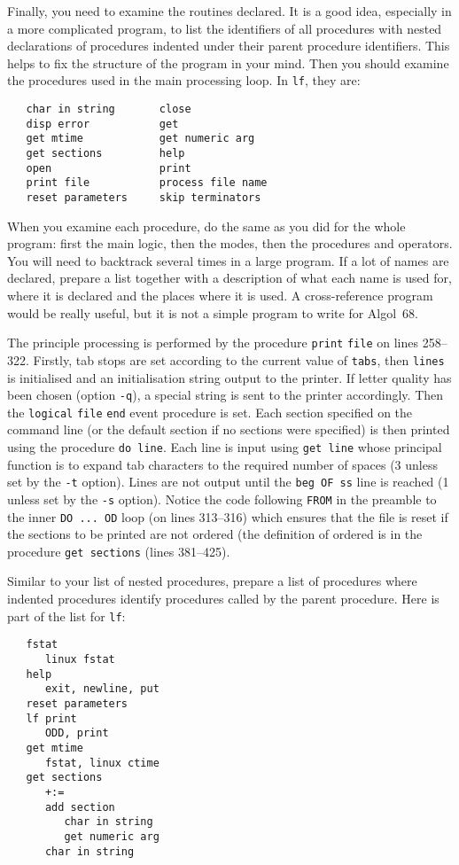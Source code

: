 Finally, you need to examine the routines declared. It is a good
idea, especially in a more complicated program, to list the
identifiers of all procedures with nested declarations of procedures
indented under their parent procedure identifiers. This helps to fix
the structure of the program in your mind. Then you should examine
the procedures used in the main processing loop.  In \verb|lf|, they
are:
\begin{verbatim}
   char in string       close
   disp error           get
   get mtime            get numeric arg
   get sections         help
   open                 print
   print file           process file name
   reset parameters     skip terminators
\end{verbatim}
\noindent
When you examine each procedure, do the same as you did for the whole
program: first the main logic, then the modes, then the procedures
and operators. You will need to backtrack several times in a large
program. If a lot of names are declared, prepare a list together with
a description of what each name is used for, where it is declared and
the places where it is used. A cross-reference program would be
really useful, but it is not a simple program to write for Algol~68.

The principle processing is performed by the procedure \verb|print|
\verb|file| on lines 258--322. Firstly, tab stops are set according
to the current value of \verb|tabs|, then \verb|lines| is initialised
and an initialisation string output to the printer. If letter quality
has been chosen (option \verb|-q|), a special string is sent to the
printer accordingly. Then the \verb|logical| \verb|file| \verb|end|
event procedure is set. Each section specified on the command line
(or the default section if no sections were specified) is then
printed using the procedure \verb|do line|. Each line is input using
\verb|get line| whose principal function is to expand tab characters
to the required number of spaces (3 unless set by the \verb|-t|
option). Lines are not output until the \verb|beg OF ss| line is
reached (1 unless set by the \verb|-s| option). Notice the code
following \verb|FROM| in the preamble to the inner \verb|DO ... OD|
loop (on lines 313--316) which ensures that the file is reset if the
sections to be printed are not ordered (the definition of ordered is
in the procedure \verb|get sections| (lines 381--425).

Similar to your list of nested procedures, prepare a list of
procedures where indented procedures identify procedures called by
the parent procedure. Here is part of the list for \verb|lf|:
\goodbreak
\begin{verbatim}
   fstat
      linux fstat
   help
      exit, newline, put
   reset parameters
   lf print
      ODD, print
   get mtime
      fstat, linux ctime
   get sections
      +:=
      add section
         char in string
         get numeric arg
      char in string
\end{verbatim}

